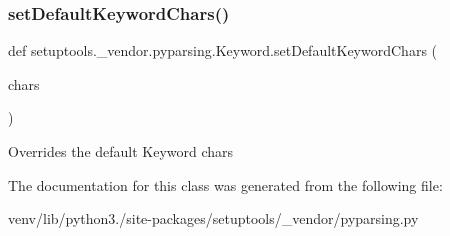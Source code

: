 \subsubsection{\texorpdfstring{set\+Default\+Keyword\+Chars()}{setDefaultKeywordChars()}}
{\footnotesize\ttfamily def setuptools.\+\_\+vendor.\+pyparsing.\+Keyword.\+set\+Default\+Keyword\+Chars (\begin{DoxyParamCaption}\item[{}]{chars }\end{DoxyParamCaption})\hspace{0.3cm}{\ttfamily [static]}}

\begin{DoxyVerb}Overrides the default Keyword chars
\end{DoxyVerb}
 

The documentation for this class was generated from the following file\+:\begin{DoxyCompactItemize}
\item 
venv/lib/python3./site-\/packages/setuptools/\+\_\+vendor/pyparsing.\+py\end{DoxyCompactItemize}
